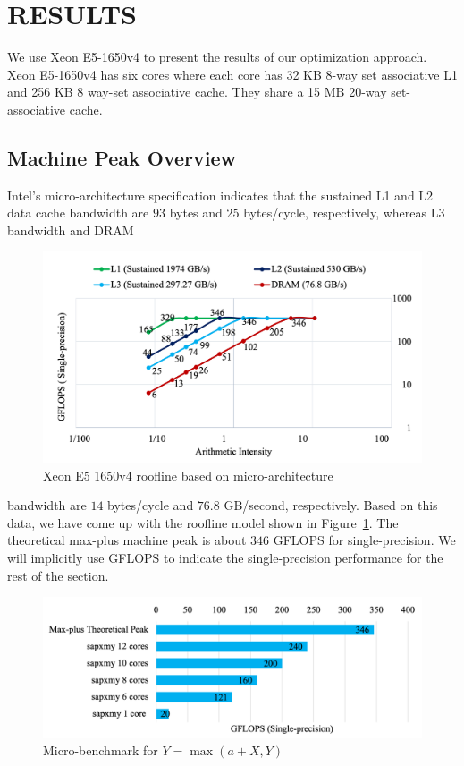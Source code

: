 \section{RESULTS} \label{section:results}
We use Xeon E5-1650v4 to present the results of our optimization approach. Xeon E5-1650v4 has six cores where each core has 32 KB 8-way set associative L1 and 256 KB 8 way-set associative cache. They share a 15 MB 20-way set-associative cache.
\subsection{Machine Peak Overview}
Intel's micro-architecture specification indicates that the sustained L1 and L2 data cache bandwidth are $93$ bytes and $25$ bytes/cycle, respectively, whereas L3 bandwidth and DRAM
\begin{figure}[htbp]
\centerline{\includegraphics[scale=0.52, trim=5 5 5 5,clip]{figure_machine_roofline.png}}
\caption{Xeon E5 1650v4 roofline based on micro-architecture  }
\label{fig:roof_line}
\end{figure}
bandwidth are $14$ bytes/cycle and $76.8$ GB/second,  respectively. Based on this data, we have come up with the roofline model shown in Figure~\ref{fig:roof_line}. The theoretical max-plus machine peak is about $346$ GFLOPS for single-precision. We will implicitly use GFLOPS to indicate the single-precision performance for the rest of the section. 
\begin{figure}[htbp]
\centerline{\includegraphics[scale=0.50, trim=5 5 5 5,clip]{figure_micro_benchmark.png}}
\caption{Micro-benchmark for $Y= \max(a+X, Y)$}
\label{fig:micro_bench_mark}
\end{figure}
